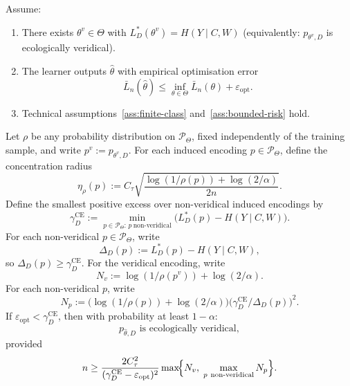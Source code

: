 \documentclass[twoside,11pt]{article}
\newcommand{\CE}{\mathrm{CE}}
\begin{document}
\begin{theorem}\label{thm:sgd-conditional}
Assume:
\begin{enumerate}[label=(\roman*)]
\item There exists $\theta^v \in \Theta$ with $L_D^*(\theta^v)=H(Y \mid C,W)$ (equivalently: $p_{\theta^v,D}$ is ecologically veridical).

\item The learner outputs $\hat\theta$ with empirical optimisation error
\[
\bar L_n(\hat\theta) \le \inf_{\theta\in\Theta}\bar L_n(\theta) + \varepsilon_{\mathrm{opt}}.
\]

\item Technical assumptions~\ref{ass:finite-class} and~\ref{ass:bounded-risk} hold.
\end{enumerate}
Let $\rho$ be any probability distribution on $\mathcal{P}_\Theta$, fixed independently of the training sample, and write $p^v := p_{\theta^v,D}$. For each induced encoding $p \in \mathcal{P}_\Theta$, define the concentration radius
\[
\eta_\rho(p)
:= C_\tau\sqrt{\frac{\log(1/\rho(p))+\log(2/\alpha)}{2n}}.
\]
Define the smallest positive excess over non-veridical induced encodings by
\[
\gamma_D^{\CE}
:= \min_{p \in \mathcal{P}_\Theta:\, p\ \text{non-veridical}}
    \bigl(L_D^*(p)-H(Y \mid C,W)\bigr).
\]
For each non-veridical $p \in \mathcal{P}_\Theta$, write
\[
\Delta_D(p) := L_D^*(p)-H(Y \mid C,W),
\]
so $\Delta_D(p)\ge \gamma_D^{\CE}$.
For the veridical encoding, write
\[
N_v := \log(1/\rho(p^v))+\log(2/\alpha).
\]
For each non-veridical $p$, write
\[
N_p := \bigl(\log(1/\rho(p))+\log(2/\alpha)\bigr)
       \bigl(\gamma_D^{\CE}/\Delta_D(p)\bigr)^2.
\]
If $\varepsilon_{\mathrm{opt}} < \gamma_D^{\CE}$, then with probability at least $1-\alpha$:
\[
p_{\hat\theta,D} \text{ is ecologically veridical},
\]
provided
\[
n \ge \frac{2C_\tau^2}{(\gamma_D^{\CE}-\varepsilon_{\mathrm{opt}})^2}
      \max\!\Bigl\{N_v,\;
      \max_{p\ \text{non-veridical}} N_p\Bigr\}.
\]
\end{theorem}
\end{document}
